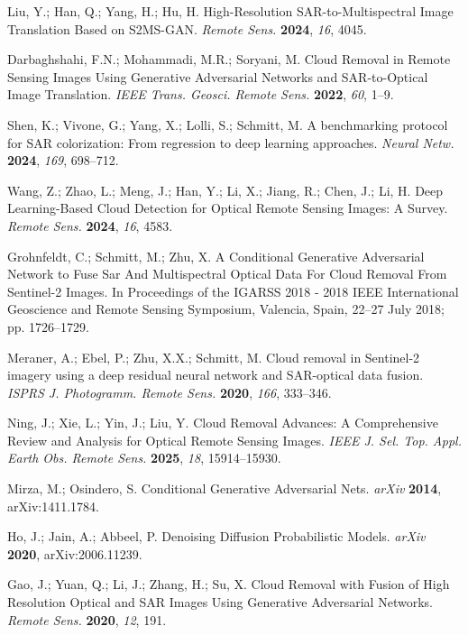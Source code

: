 Liu, Y.; Han, Q.; Yang, H.; Hu, H. High-Resolution SAR-to-Multispectral Image Translation Based on S2MS-GAN. {\em Remote Sens.} {\bf 2024}, {\em 16}, 4045.

Darbaghshahi, F.N.; Mohammadi, M.R.; Soryani, M. Cloud Removal in Remote Sensing Images Using Generative Adversarial Networks and SAR-to-Optical Image Translation. {\em IEEE Trans. Geosci. Remote Sens.} {\bf 2022}, {\em 60}, 1--9.

Shen, K.; Vivone, G.; Yang, X.; Lolli, S.; Schmitt, M. A benchmarking protocol for SAR colorization: From regression to deep learning approaches. {\em Neural Netw.} {\bf 2024}, {\em 169}, 698--712.

Wang, Z.; Zhao, L.; Meng, J.; Han, Y.; Li, X.; Jiang, R.; Chen, J.; Li, H. Deep Learning-Based Cloud Detection for Optical Remote Sensing Images: A Survey. {\em Remote Sens.} {\bf 2024}, {\em 16}, 4583.

Grohnfeldt, C.; Schmitt, M.; Zhu, X. A Conditional Generative Adversarial Network to Fuse Sar And Multispectral Optical Data For Cloud Removal From Sentinel-2 Images. In Proceedings of the IGARSS 2018 - 2018 IEEE International Geoscience and Remote Sensing Symposium, Valencia, Spain, 22–27 July 2018; pp. 1726--1729.

Meraner, A.; Ebel, P.; Zhu, X.X.; Schmitt, M. Cloud removal in Sentinel-2 imagery using a deep residual neural network and SAR-optical data fusion. {\em ISPRS J. Photogramm. Remote Sens.} {\bf 2020}, {\em 166}, 333--346.

Ning, J.; Xie, L.; Yin, J.; Liu, Y. Cloud Removal Advances: A Comprehensive Review and Analysis for Optical Remote Sensing Images. {\em IEEE J. Sel. Top. Appl. Earth Obs. Remote Sens.} {\bf 2025}, {\em 18}, 15914--15930.

Mirza, M.; Osindero, S. Conditional Generative Adversarial Nets. {\em arXiv} {\bf 2014}, arXiv:1411.1784.

Ho, J.; Jain, A.; Abbeel, P. Denoising Diffusion Probabilistic Models. {\em arXiv} {\bf 2020}, arXiv:2006.11239.

Gao, J.; Yuan, Q.; Li, J.; Zhang, H.; Su, X. Cloud Removal with Fusion of High Resolution Optical and SAR Images Using Generative Adversarial Networks. {\em Remote Sens.} {\bf 2020}, {\em 12}, 191.

